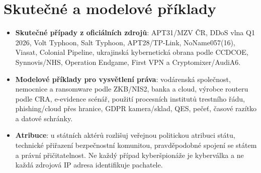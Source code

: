 \documentclass[11pt,a4paper]{article}
\begin{document}
\section*{Skutečné a modelové příklady}
\begin{itemize}
  \item \textbf{Skutečné případy z oficiálních zdrojů}: APT31/MZV ČR, DDoS vlna Q1 2026, Volt Typhoon, Salt Typhoon, APT28/TP-Link, NoName057(16), Viasat, Colonial Pipeline, ukrajinská kybernetická obrana podle CCDCOE, Synnovis/NHS, Operation Endgame, First VPN a Cryptomixer/AudiA6.
  \item \textbf{Modelové příklady pro vysvětlení práva}: vodárenská společnost, nemocnice a ransomware podle ZKB/NIS2, banka a cloud, výrobce routeru podle CRA, e-evidence scénář, použití procesních institutů trestního řádu, phishing/cloud přes hranice, GDPR kamera/sklad, QES, pečeť, časové razítko a datové schránky.
  \item \textbf{Atribuce}: u státních aktérů rozlišuj veřejnou politickou atribuci státu, technické přiřazení bezpečnostní komunitou, pravděpodobné spojení se státem a právní přičitatelnost. Ne každý případ kyberšpionáže je kyberválka a ne každá zdrojová IP adresa identifikuje pachatele.
\end{itemize}
\end{document}
